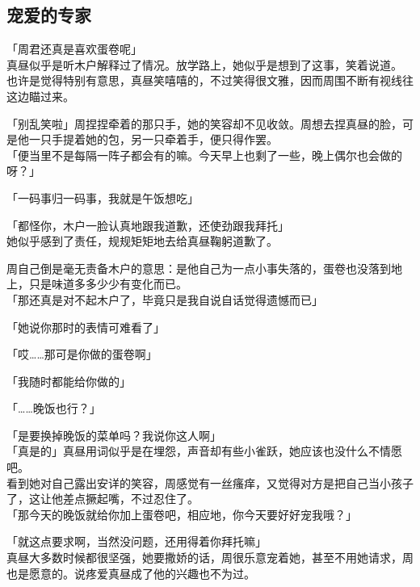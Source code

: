 \subsection{宠爱的专家}

「周君还真是喜欢蛋卷呢」\\

真昼似乎是听木户解释过了情况。放学路上，她似乎是想到了这事，笑着说道。\\

也许是觉得特别有意思，真昼笑嘻嘻的，不过笑得很文雅，因而周围不断有视线往这边瞄过来。

「别乱笑啦」周捏捏牵着的那只手，她的笑容却不见收敛。周想去捏真昼的脸，可是他一只手提着她的包，另一只牵着手，便只得作罢。\\

「便当里不是每隔一阵子都会有的嘛。今天早上也剩了一些，晚上偶尔也会做的呀？」

「一码事归一码事，我就是午饭想吃」

「都怪你，木户一脸认真地跟我道歉，还使劲跟我拜托」\\

她似乎感到了责任，规规矩矩地去给真昼鞠躬道歉了。

周自己倒是毫无责备木户的意思：是他自己为一点小事失落的，蛋卷也没落到地上，只是味道多多少少有变化而已。\\

「那还真是对不起木户了，毕竟只是我自说自话觉得遗憾而已」

「她说你那时的表情可难看了」

「哎……那可是你做的蛋卷啊」

「我随时都能给你做的」

「……晚饭也行？」

「是要换掉晚饭的菜单吗？我说你这人啊」\\

「真是的」真昼用词似乎是在埋怨，声音却有些小雀跃，她应该也没什么不情愿吧。\\

看到她对自己露出安详的笑容，周感觉有一丝瘙痒，又觉得对方是把自己当小孩子了，这让他差点撅起嘴，不过忍住了。\\

「那今天的晚饭就给你加上蛋卷吧，相应地，你今天要好好宠我哦？」

「就这点要求啊，当然没问题，还用得着你拜托嘛」\\

真昼大多数时候都很坚强，她要撒娇的话，周很乐意宠着她，甚至不用她请求，周也是愿意的。说疼爱真昼成了他的兴趣也不为过。\\

